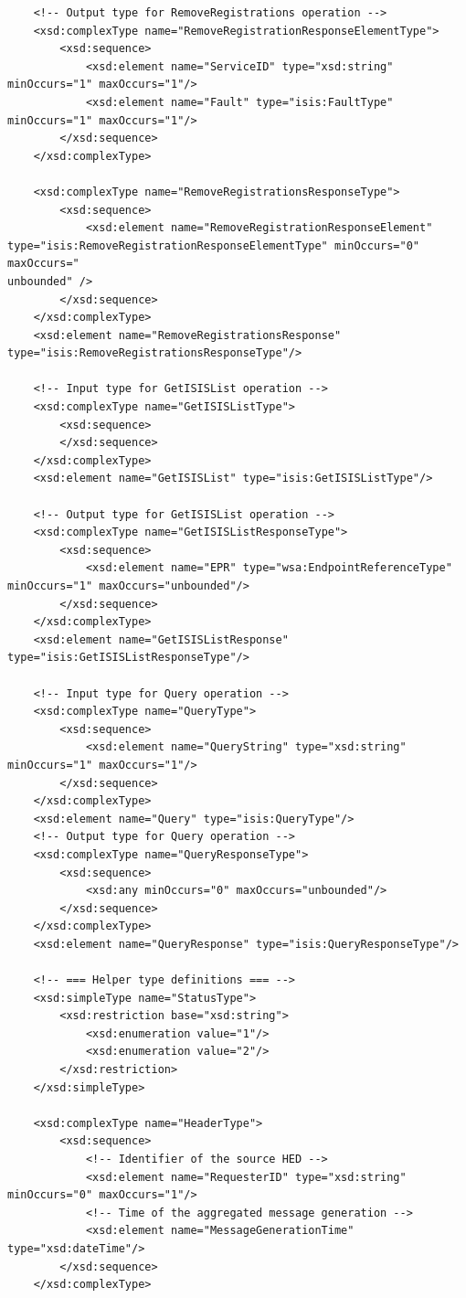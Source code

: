 \documentclass{book}
\begin{document}
\begin{verbatim}
    <!-- Output type for RemoveRegistrations operation -->
    <xsd:complexType name="RemoveRegistrationResponseElementType">
        <xsd:sequence>
            <xsd:element name="ServiceID" type="xsd:string" minOccurs="1" maxOccurs="1"/>
            <xsd:element name="Fault" type="isis:FaultType" minOccurs="1" maxOccurs="1"/>
        </xsd:sequence>
    </xsd:complexType>

    <xsd:complexType name="RemoveRegistrationsResponseType">
        <xsd:sequence>
            <xsd:element name="RemoveRegistrationResponseElement" type="isis:RemoveRegistrationResponseElementType" minOccurs="0" maxOccurs="
unbounded" />
        </xsd:sequence>
    </xsd:complexType>
    <xsd:element name="RemoveRegistrationsResponse" type="isis:RemoveRegistrationsResponseType"/>

    <!-- Input type for GetISISList operation -->
    <xsd:complexType name="GetISISListType">
        <xsd:sequence>
        </xsd:sequence>
    </xsd:complexType>
    <xsd:element name="GetISISList" type="isis:GetISISListType"/>

    <!-- Output type for GetISISList operation -->
    <xsd:complexType name="GetISISListResponseType">
        <xsd:sequence>
            <xsd:element name="EPR" type="wsa:EndpointReferenceType" minOccurs="1" maxOccurs="unbounded"/>
        </xsd:sequence>
    </xsd:complexType>
    <xsd:element name="GetISISListResponse" type="isis:GetISISListResponseType"/>

    <!-- Input type for Query operation -->
    <xsd:complexType name="QueryType">
        <xsd:sequence>
            <xsd:element name="QueryString" type="xsd:string" minOccurs="1" maxOccurs="1"/>
        </xsd:sequence>
    </xsd:complexType>
    <xsd:element name="Query" type="isis:QueryType"/>
    <!-- Output type for Query operation -->
    <xsd:complexType name="QueryResponseType">
        <xsd:sequence>
            <xsd:any minOccurs="0" maxOccurs="unbounded"/>
        </xsd:sequence>
    </xsd:complexType>
    <xsd:element name="QueryResponse" type="isis:QueryResponseType"/>

    <!-- === Helper type definitions === -->
    <xsd:simpleType name="StatusType">
        <xsd:restriction base="xsd:string">
            <xsd:enumeration value="1"/>
            <xsd:enumeration value="2"/>
        </xsd:restriction>
    </xsd:simpleType>

    <xsd:complexType name="HeaderType">
        <xsd:sequence>
            <!-- Identifier of the source HED -->
            <xsd:element name="RequesterID" type="xsd:string" minOccurs="0" maxOccurs="1"/>
            <!-- Time of the aggregated message generation -->
            <xsd:element name="MessageGenerationTime" type="xsd:dateTime"/>
        </xsd:sequence>
    </xsd:complexType>


\end{verbatim}
\end{document}
